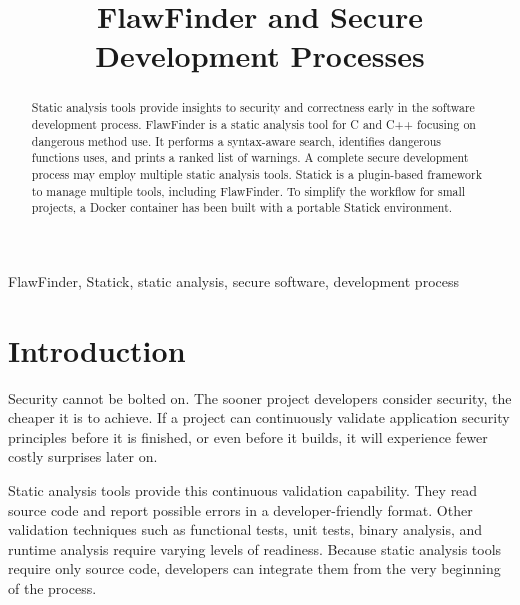\documentclass[journal]{IEEEtran}
\begin{document}

\title{FlawFinder and Secure Development Processes}

\author{
}

\maketitle



\begin{abstract}
Static analysis tools provide insights to security and correctness early in the software development
process. FlawFinder is a static analysis tool for C and C++ focusing on dangerous method use. It
performs a syntax-aware search, identifies dangerous functions uses, and prints a ranked list of
warnings. A complete secure development process may employ multiple static analysis tools. Statick
is a plugin-based framework to manage multiple tools, including FlawFinder. To simplify the workflow
for small projects, a Docker container has been built with a portable Statick environment.
\end{abstract}

\begin{IEEEkeywords}
FlawFinder, Statick, static analysis, secure software, development process
\end{IEEEkeywords}



\section{Introduction}

Security cannot be bolted on. The sooner project developers consider security, the cheaper it is to
achieve. If a project can continuously validate application security principles before it is
finished, or even before it builds, it will experience fewer costly surprises later on.

Static analysis tools provide this continuous validation capability. They read source code and
report possible errors in a developer-friendly format. Other validation techniques such as
functional tests, unit tests, binary analysis, and runtime analysis require varying levels of
readiness. Because static analysis tools require only source code, developers can integrate them
from the very beginning of the process.
\end{document}
